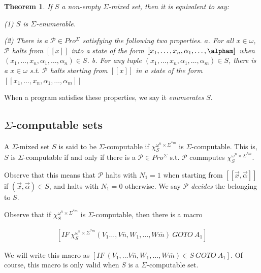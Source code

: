 \documentclass[a4paper, 12pt]{article}
\newtheorem{theorem}{Theorem}
\newtheorem{theorem}{Theorem}
\begin{document}
\begin{theorem}
    If $S$ a non-empty $\Sigma$-mixed set, then it is equivalent to say: 

    \textit{(1)} $S$ is $\Sigma$-enumerable. 

    \textit{(2)} There is a $\mathcal{P} \in Pro^{\Sigma}$ satisfying the
    following two properties. $a.$ For all $x \in \omega$, $\mathcal{P}$ halts
    from $[\![ x ]\!]$ into a state of the form $[\![ x_1, \ldots, x_n,
    \alpha_1, \ldots, \alpham ]\!]$ when $(x_1, \ldots, x_n, \alpha_1, \ldots,
    \alpha_n) \in S$. \textit{b.} For any tuple $(x_1, \ldots, x_n, \alpha_1, \ldots, \alpha_m) \in
S$, there is a $x \in \omega$ s.t. $\mathcal{P}$ halts starting from $[\![ x
]\!]$ in a state of the form $[\![ x_1, \ldots, x_n, \alpha_1, \ldots, \alpha_m ]\!]$ 

\end{theorem}

When a program satisfies these properties, we say it \textit{enumerates} $S$.

\subsection{$\Sigma$-computable sets}

A $\Sigma$-mixed set $S$ is said to be $\Sigma$-computable if
$\chi_{S}^{\omega^n \times \Sigma^{*m}}$ is $\Sigma$-computable. This is, $S$ is
$\Sigma$-computable if and only if there is a $\mathcal{P} \in Pro^{\Sigma}$
s.t. $\mathcal{P}$ commputes $\chi_S^{\omega^n \times \Sigma^{*m}}$. 

Observe that this means that $\mathcal{P}$ halts with $N_1 = 1$ when starting
from $[\![ \overrightarrow{x}, \overrightarrow{\alpha} ]\!]$ if
$(\overrightarrow{x}, \overrightarrow{\alpha}) \in S$, and halts with $N_1 = 0$
otherwise. We say $\mathcal{P}$ \textit{decides} the belonging to $S$.

Observe that if $\chi_S^{\omega^n \times \Sigma^{*m}}$ is $\Sigma$-computable,
then there is a macro 

\begin{align*}
    \left[ IF ~ \chi_S^{\omega^n \times \Sigma^{*m}} \left( V_1 \ldots, V
    \overline{n}, W_1, \ldots, W \overline{m} \right) ~ GOTO ~ A_1  \right] 
\end{align*}

We will write this macro as $\left[ IF ~ (V_1, \ldots V \overline{n}, W_1, \ldots,
W \overline{m}) \in S ~ GOTO ~ A_1 \right] $. Of course, this macro is only
valid when $S$ is a $\Sigma$-computable set.
\end{document}
